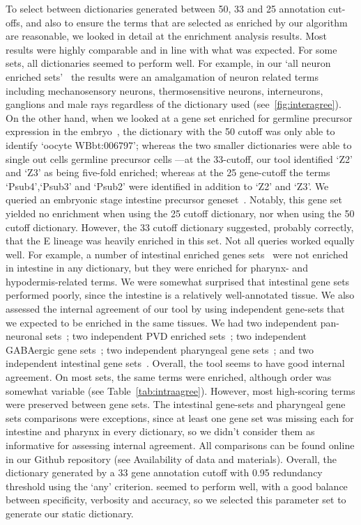 \documentclass{bmcart}
\begin{document}
To select between dictionaries generated between 50, 33 and 25 annotation cut-offs, and also to ensure the terms that are selected as enriched by our algorithm are reasonable, we looked in detail at the enrichment analysis results.
Most results were highly comparable and in line with what was expected. For some sets, all dictionaries seemed to perform well. For example, in our `all neuron enriched sets'~\cite{Spencer2011, Watson2008a} the results were an amalgamation of neuron related terms including mechanosensory neurons, thermosensitive neurons, interneurons, ganglions and male rays regardless of the dictionary used (see~\ref{fig:interagree}). On the other hand, when we looked at a gene set enriched for germline precursor expression in the embryo~\cite{Spencer2011}, the dictionary with the 50 cutoff was only able to identify `oocyte WBbt:006797'; whereas the two smaller dictionaries were able to single out cells germline precursor cells ---at the 33-cutoff, our tool identified `Z2' and `Z3' as being five-fold enriched; whereas at the 25 gene-cutoff the terms `Psub4',`Psub3' and `Psub2' were identified in addition to `Z2' and `Z3'.
We queried an embryonic stage intestine precursor geneset~\cite{Spencer2011}. Notably, this gene set yielded no enrichment when using the 25 cutoff dictionary, nor when using the 50 cutoff dictionary. However, the 33 cutoff dictionary suggested, probably correctly, that the E lineage was heavily enriched in this set.
Not all queries worked equally well. For example, a number of intestinal enriched genes sets~\cite{Spencer2011, Pauli2006} were not enriched in intestine in any dictionary, but they were enriched for pharynx- and hypodermis-related terms. We were somewhat surprised that intestinal gene sets performed poorly, since the intestine is a relatively well-annotated tissue.
We also assessed the internal agreement of our tool by using independent gene-sets that we expected to be enriched in the same tissues. We had two independent pan-neuronal sets~\cite{Spencer2011, Watson2008a}; two independent PVD enriched sets~\cite{Spencer2011, Smith2010}; two independent GABAergic gene sets~\cite{Spencer2011, Cinar2005}; two independent pharyngeal gene sets~\cite{Spencer2011, Gaudet2004a}; and two independent intestinal gene sets~\cite{Spencer2011, Pauli2006}. Overall, the tool seems to have good internal agreement. On most sets, the same terms were enriched, although order was somewhat variable (see Table~\ref{tab:intraagree}). However, most high-scoring terms were preserved between gene sets. The intestinal gene-sets and pharyngeal gene sets comparisons were exceptions, since at least one gene set was missing each for intestine and pharynx in every dictionary, so we didn't consider them as informative for assessing internal agreement. All comparisons can be found online in our Github repository (see Availability of data and materials). Overall, the dictionary generated by a 33 gene annotation cutoff with 0.95
redundancy threshold using the `any' criterion. seemed to perform well, with a good balance between specificity, verbosity and accuracy, so we selected this parameter set to generate our static dictionary.
\end{document}
